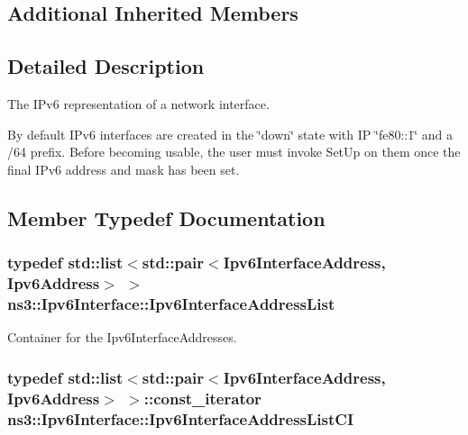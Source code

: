 \subsection*{Additional Inherited Members}


\subsection{Detailed Description}
The I\+Pv6 representation of a network interface. 

By default I\+Pv6 interfaces are created in the \char`\"{}down\char`\"{} state with IP \char`\"{}fe80\+::1\char`\"{} and a /64 prefix. Before becoming usable, the user must invoke Set\+Up on them once the final I\+Pv6 address and mask has been set. 

\subsection{Member Typedef Documentation}
\subsubsection[{\texorpdfstring{Ipv6\+Interface\+Address\+List}{Ipv6InterfaceAddressList}}]{\setlength{\rightskip}{0pt plus 5cm}typedef {\bf std\+::list}$<$std\+::pair$<${\bf Ipv6\+Interface\+Address}, {\bf Ipv6\+Address}$>$ $>$ {\bf ns3\+::\+Ipv6\+Interface\+::\+Ipv6\+Interface\+Address\+List}\hspace{0.3cm}{\ttfamily [private]}}\hypertarget{classns3_1_1Ipv6Interface_a8983603129d14da06c4bdeec91f1f9df}{}\label{classns3_1_1Ipv6Interface_a8983603129d14da06c4bdeec91f1f9df}


Container for the Ipv6\+Interface\+Addresses. 

\subsubsection[{\texorpdfstring{Ipv6\+Interface\+Address\+List\+CI}{Ipv6InterfaceAddressListCI}}]{\setlength{\rightskip}{0pt plus 5cm}typedef {\bf std\+::list}$<$std\+::pair$<${\bf Ipv6\+Interface\+Address}, {\bf Ipv6\+Address}$>$ $>$\+::const\+\_\+iterator {\bf ns3\+::\+Ipv6\+Interface\+::\+Ipv6\+Interface\+Address\+List\+CI}\hspace{0.3cm}{\ttfamily [private]}}\hypertarget{classns3_1_1Ipv6Interface_a715fc50c7b144e64d4849d26ad6c0b32}{}\label{classns3_1_1Ipv6Interface_a715fc50c7b144e64d4849d26ad6c0b32}


